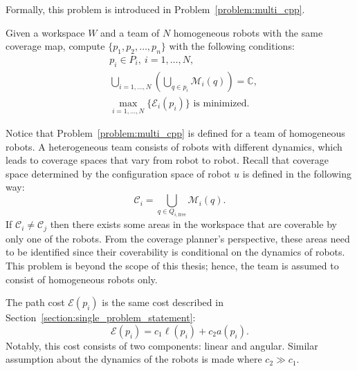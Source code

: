 \documentclass[../main.tex]{subfiles}
\begin{document}
Formally, this problem is introduced in Problem~\ref{problem:multi_cpp}.
\begin{problem}
\label{problem:multi_cpp}
	Given a workspace $W$ and a team of $N$ homogeneous robots with the same coverage map, compute $\{p_1,p_2,\ldots,p_n\}$ with the following conditions:
	\begin{equation}
	\begin{aligned}
		& p_i\in P_{i},\ i=1,\dots,N,\\
		& \bigcup_{i=1,\dots,N}\left(\bigcup_{q\in p_i}\mathcal{M}_i(q)\right)=\mathbb{C},\\
		& \max_{i=1,\ldots,N}\{\mathcal{E}_i(p_i)\}\text{ is minimized.}
	\end{aligned}
	\end{equation}
\end{problem}

\begin{remark}
	Notice that Problem~\ref{problem:multi_cpp} is defined for a team of homogeneous robots.
	A heterogeneous team consists of robots with different dynamics, which leads to coverage spaces that vary from robot to robot. Recall that coverage space determined by the configuration space of robot $u$ is defined in the following way:
	\begin{equation}
		\mathcal{C}_i=\bigcup_{q\in Q_{i,\text{free}}}\mathcal{M}_i(q).
	\end{equation}
	If $\mathcal{C}_i\neq\mathcal{C}_j$ then there exists some areas in the workspace that are coverable by only one of the robots. From the coverage planner's perspective, these areas need to be identified since their coverability is conditional on the dynamics of robots. This problem is beyond the scope of this thesis; hence, the team is assumed to consist of homogeneous robots only.

	\RE
\end{remark}

\begin{remark}
	The path cost $\mathcal{E}(p_i)$ is the same cost described in Section~\ref{section:single_problem_statement}:
	\begin{equation}
		\mathcal{E}(p_i)=c_1\ell(p_i)+c_2a(p_i).
	\end{equation}
	Notably, this cost consists of two components: linear and angular. Similar assumption about the dynamics of the robots is made where $c_2\gg c_1$.

\RE
\end{remark}
\end{document}
